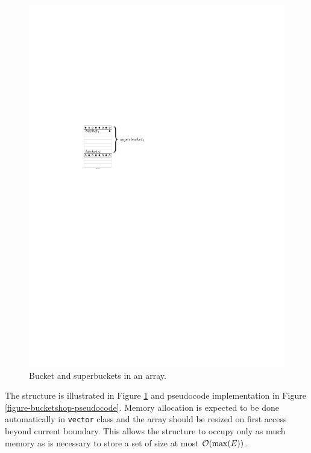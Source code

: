 \begin{figure}[h!]
	\centering\hspace{2.5cm}
	\includegraphics{img/bucketshop.pdf}
	\caption{Bucket and superbuckets in an array.}
	\label{figure-bucketshop}
\end{figure}

The structure is illustrated in Figure \ref{figure-bucketshop} and pseudocode
implementation in Figure \ref{figure-bucketshop-pseudocode}. Memory allocation
is expected to be done automatically in {\tt vector} class and the array should
be resized on first access beyond current boundary.  This allows the structure
to occupy only as much memory as is necessary to store a set of size at most
$\mathcal{O}(\max(E))$.

